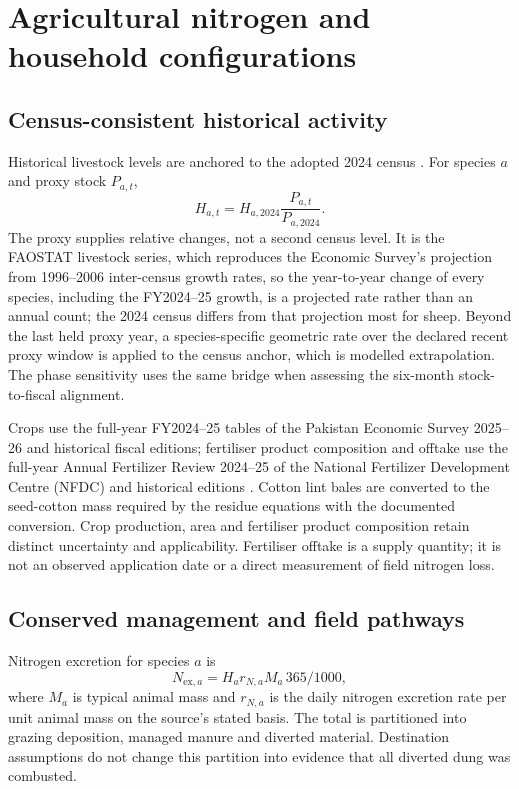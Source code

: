 \documentclass[essd]{copernicus}
\begin{document}
\section{Agricultural nitrogen and household configurations}
\subsection{Census-consistent historical activity}
Historical livestock levels are anchored to the adopted 2024 census \citep{PBSAgri2026}. For species $a$ and proxy stock $P_{a,t}$,
\begin{equation}
 H_{a,t}=H_{a,2024}\frac{P_{a,t}}{P_{a,2024}}.
 \label{eq:livestock_bridge}
\end{equation}
The proxy supplies relative changes, not a second census level. It is the FAOSTAT livestock series, which reproduces the Economic Survey's projection from 1996--2006 inter-census growth rates, so the year-to-year change of every species, including the FY2024--25 growth, is a projected rate rather than an annual count; the 2024 census differs from that projection most for sheep. Beyond the last held proxy year, a species-specific geometric rate over the declared recent proxy window is applied to the census anchor, which is modelled extrapolation. The phase sensitivity uses the same bridge when assessing the six-month stock-to-fiscal alignment.

Crops use the full-year FY2024--25 tables of the Pakistan Economic Survey 2025--26 and historical fiscal editions; fertiliser product composition and offtake use the full-year Annual Fertilizer Review 2024--25 of the National Fertilizer Development Centre (NFDC) and historical editions \citep{MoF2024,MoF2026,NFDC2024,NFDC2025}. Cotton lint bales are converted to the seed-cotton mass required by the residue equations with the documented conversion. Crop production, area and fertiliser product composition retain distinct uncertainty and applicability. Fertiliser offtake is a supply quantity; it is not an observed application date or a direct measurement of field nitrogen loss.

\subsection{Conserved management and field pathways}
Nitrogen excretion for species $a$ is
\begin{equation}
 N_{\mathrm{ex},a}=H_a r_{N,a} M_a\,365/1000,
 \label{eq:excretion}
\end{equation}
where $M_a$ is typical animal mass and $r_{N,a}$ is the daily nitrogen excretion rate per unit animal mass on the source's stated basis. The total is partitioned into grazing deposition, managed manure and diverted material. Destination assumptions do not change this partition into evidence that all diverted dung was combusted.
\end{document}
